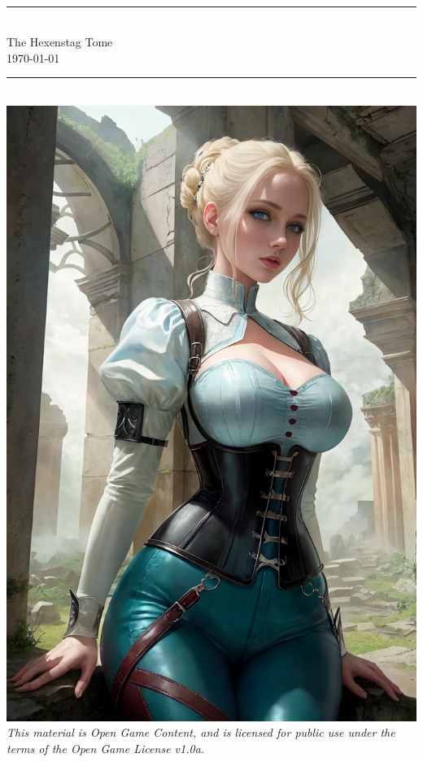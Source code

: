 \documentclass[12pt,twoside,onecolumn,openany,final]{memoir}
\begin{document}

\thispagestyle{empty}
\begin{center}
\textsc{\Large}\\[0.25cm]
\rule{\linewidth}{0.5mm} \\[0.6cm]
\fontsize{30}{30} \selectfont The Hexenstag Tome\\[.30cm]
\fontsize{16}{18} \selectfont \normalsize{\today}\\
\rule{\linewidth}{0.5mm} \\[0.6cm]
\includegraphics[scale=.37]{cover-image.png} %
\vfill
\footnotesize{\textit{This material is Open Game Content, and is licensed for public use under the terms of the Open Game License v1.0a.}}\\
\end{center}
\end{document}
